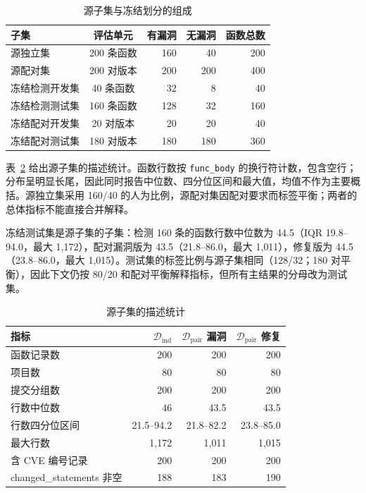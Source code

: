 \documentclass[conference]{IEEEtran}
\newcommand{\Dind}{\mathcal{D}_{\mathrm{ind}}}
\newcommand{\Dpair}{\mathcal{D}_{\mathrm{pair}}}
\begin{document}
\begin{table}[t]
\caption{源子集与冻结划分的组成}
\label{tab:data-composition}
\centering
\small
\begin{tabular}{@{}lcrrr@{}}
\toprule
子集 & 评估单元 & 有漏洞 & 无漏洞 & 函数总数\\
\midrule
源独立集 & 200 条函数 & 160 & 40 & 200\\
源配对集 & 200 对版本 & 200 & 200 & 400\\
冻结检测开发集 & 40 条函数 & 32 & 8 & 40\\
冻结检测测试集 & 160 条函数 & 128 & 32 & 160\\
冻结配对开发集 & 20 对版本 & 20 & 20 & 40\\
冻结配对测试集 & 180 对版本 & 180 & 180 & 360\\
\bottomrule
\end{tabular}
\end{table}

表~\ref{tab:data-stats} 给出源子集的描述统计。函数行数按 \texttt{func\_body} 的换行符计数，包含空行；分布呈明显长尾，因此同时报告中位数、四分位区间和最大值，均值不作为主要概括。源独立集采用 160/40 的人为比例，源配对集因配对要求而标签平衡；两者的总体指标不能直接合并解释。

冻结测试集是源子集的子集：检测 160 条的函数行数中位数为 44.5（IQR 19.8--94.0，最大 1{,}172），配对漏洞版为 43.5（21.8--86.0，最大 1{,}011），修复版为 44.5（23.8--86.0，最大 1{,}015）。测试集的标签比例与源子集相同（128/32；180 对平衡），因此下文仍按 80/20 和配对平衡解释指标，但所有主结果的分母改为测试集。

\begin{table}[t]
\caption{源子集的描述统计}
\label{tab:data-stats}
\centering
\scriptsize
\begin{tabular}{@{}lrrr@{}}
\toprule
指标 & $\Dind$ & $\Dpair$ 漏洞 & $\Dpair$ 修复\\
\midrule
函数记录数 & 200 & 200 & 200\\
项目数 & 80 & 80 & 80\\
提交分组数 & 200 & 200 & 200\\
行数中位数 & 46 & 43.5 & 43.5\\
行数四分位区间 & 21.5--94.2 & 21.8--82.2 & 23.8--85.0\\
最大行数 & 1{,}172 & 1{,}011 & 1{,}015\\
含 CVE 编号记录 & 200 & 200 & 200\\
changed\_statements 非空 & 188 & 183 & 190\\
\bottomrule
\end{tabular}
\end{table}
\end{document}
